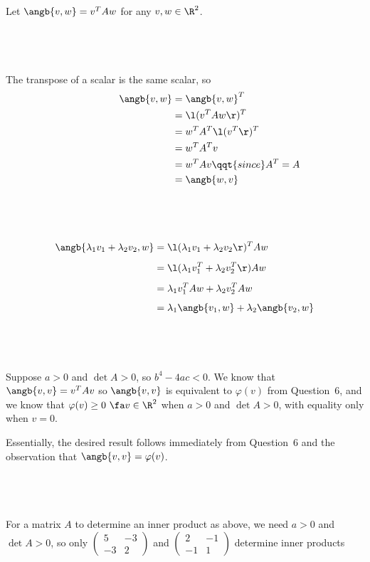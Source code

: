 \documentclass[a4paper]{article}
\begin{document}
Let $\angb{v,w} = v^T A w$ for any $v, w \in \R^2$.

\subsection{~}

The transpose of a scalar is the same scalar, so \begin{align*}
\quad\qquad\qquad \angb{v, w} &= \angb{v, w}^T\\
&= \l( v^T A w \r)^T\\
&= w^T A^T \l( v^T \r)^T\\
&= w^T A^T v\\
&= w^T A v \qqt{since }A^T = A\\
&= \angb{w, v}
\end{align*}

\subsection{~}

\begin{align*}
\angb{\lambda_1 v_1 + \lambda_2 v_2, w} &= \l(\lambda_1 v_1 + \lambda_2 v_2\r)^T A w\\[1ex]
&= \l(\lambda_1 v_1^T + \lambda_2 v_2^T\r) A w\\[1ex]
&= \lambda_1 v_1^T A w + \lambda_2 v_2^T A w\\[1ex]
&= \lambda_1 \angb{v_1, w} + \lambda_2 \angb{v_2, w}
\end{align*}

\subsection{~}

Suppose $a > 0$ and $\det A > 0$, so $b^4 - 4ac < 0$. We know that $\angb{v, v} = v^T A v$ so $\angb{v, v}$ is equivalent to $\varphi(v)$ from Question~6, and we know that $\varphi(v) \ge 0\ \fa v \in \R^2$ when $a > 0$ and $\det A > 0$, with equality only when $v=0$.

Essentially, the desired result follows immediately from Question~6 and the observation that $\angb{v, v} = \varphi(v)$.

\subsection{~}

For a matrix $A$ to determine an inner product as above, we need $a > 0$ and $\det A > 0$, so only $\begin{pmatrix}5 & -3\\ -3 & 2\end{pmatrix}$ and $\begin{pmatrix}2 & -1\\ -1 & 1\end{pmatrix}$ determine inner products

\end{document}
